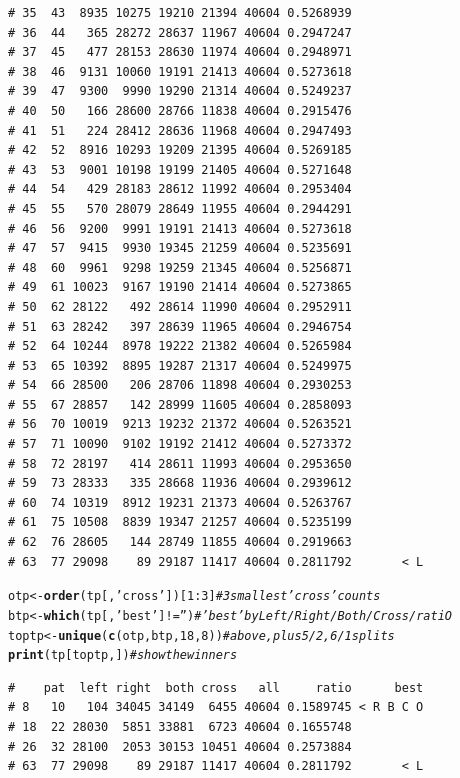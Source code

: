 \documentclass{article}\usepackage[]{graphicx}\usepackage[]{color}
\makeatletter
\newcommand{\hlnum}[1]{\textcolor[rgb]{0.686,0.059,0.569}{#1}}%
\newcommand{\hlstr}[1]{\textcolor[rgb]{0.192,0.494,0.8}{#1}}%
\newcommand{\hlcom}[1]{\textcolor[rgb]{0.678,0.584,0.686}{\textit{#1}}}%
\newcommand{\hlopt}[1]{\textcolor[rgb]{0,0,0}{#1}}%
\newcommand{\hlstd}[1]{\textcolor[rgb]{0.345,0.345,0.345}{#1}}%
\newcommand{\hlkwb}[1]{\textcolor[rgb]{0.69,0.353,0.396}{#1}}%
\newcommand{\hlkwd}[1]{\textcolor[rgb]{0.737,0.353,0.396}{\textbf{#1}}}%
\newenvironment{kframe}{%
 \def\at@end@of@kframe{}%
 \ifinner\ifhmode%
  \def\at@end@of@kframe{\end{minipage}}%
  \begin{minipage}{\columnwidth}%
 \fi\fi%
 \def\FrameCommand##1{\hskip\@totalleftmargin \hskip-\fboxsep
 \colorbox{shadecolor}{##1}\hskip-\fboxsep
     \hskip-\linewidth \hskip-\@totalleftmargin \hskip\columnwidth}%
 \MakeFramed {\advance\hsize-\width
   \@totalleftmargin\z@ \linewidth\hsize
   \@setminipage}}%
 {\par\unskip\endMakeFramed%
 \at@end@of@kframe}
\newenvironment{knitrout}{}{} %
\makeatother
\begin{document}
\begin{knitrout}
\begin{kframe}
\begin{verbatim}
# 35  43  8935 10275 19210 21394 40604 0.5268939          
# 36  44   365 28272 28637 11967 40604 0.2947247          
# 37  45   477 28153 28630 11974 40604 0.2948971          
# 38  46  9131 10060 19191 21413 40604 0.5273618          
# 39  47  9300  9990 19290 21314 40604 0.5249237          
# 40  50   166 28600 28766 11838 40604 0.2915476          
# 41  51   224 28412 28636 11968 40604 0.2947493          
# 42  52  8916 10293 19209 21395 40604 0.5269185          
# 43  53  9001 10198 19199 21405 40604 0.5271648          
# 44  54   429 28183 28612 11992 40604 0.2953404          
# 45  55   570 28079 28649 11955 40604 0.2944291          
# 46  56  9200  9991 19191 21413 40604 0.5273618          
# 47  57  9415  9930 19345 21259 40604 0.5235691          
# 48  60  9961  9298 19259 21345 40604 0.5256871          
# 49  61 10023  9167 19190 21414 40604 0.5273865          
# 50  62 28122   492 28614 11990 40604 0.2952911          
# 51  63 28242   397 28639 11965 40604 0.2946754          
# 52  64 10244  8978 19222 21382 40604 0.5265984          
# 53  65 10392  8895 19287 21317 40604 0.5249975          
# 54  66 28500   206 28706 11898 40604 0.2930253          
# 55  67 28857   142 28999 11605 40604 0.2858093          
# 56  70 10019  9213 19232 21372 40604 0.5263521          
# 57  71 10090  9102 19192 21412 40604 0.5273372          
# 58  72 28197   414 28611 11993 40604 0.2953650          
# 59  73 28333   335 28668 11936 40604 0.2939612          
# 60  74 10319  8912 19231 21373 40604 0.5263767          
# 61  75 10508  8839 19347 21257 40604 0.5235199          
# 62  76 28605   144 28749 11855 40604 0.2919663          
# 63  77 29098    89 29187 11417 40604 0.2811792       < L
\end{verbatim}
\end{kframe}
\end{knitrout}
\begin{knitrout}\footnotesize
{}\color{fgcolor}\begin{kframe}
\begin{alltt}
\hlstd{otp} \hlkwb{<-} \hlkwd{order}\hlstd{(tp[,}\hlstr{'cross'}\hlstd{])[}\hlnum{1}\hlopt{:}\hlnum{3}\hlstd{]}    \hlcom{# 3 smallest 'cross' counts}
\hlstd{btp} \hlkwb{<-} \hlkwd{which}\hlstd{(tp[,}\hlstr{'best'}\hlstd{]} \hlopt{!=} \hlstr{''}\hlstd{)}    \hlcom{# 'best' by Left/Right/Both/Cross/ratiO}
\hlstd{toptp} \hlkwb{<-} \hlkwd{unique}\hlstd{(}\hlkwd{c}\hlstd{(otp,btp,}\hlnum{18}\hlstd{,}\hlnum{8}\hlstd{))}   \hlcom{# above, plus 5/2, 6/1 splits}
\hlkwd{print}\hlstd{(tp[toptp,])}                  \hlcom{# show the winners}
\end{alltt}
\begin{verbatim}
#    pat  left right  both cross   all     ratio      best
# 8   10   104 34045 34149  6455 40604 0.1589745 < R B C O
# 18  22 28030  5851 33881  6723 40604 0.1655748          
# 26  32 28100  2053 30153 10451 40604 0.2573884          
# 63  77 29098    89 29187 11417 40604 0.2811792       < L
\end{verbatim}
\end{kframe}
\end{knitrout}
\end{document}
